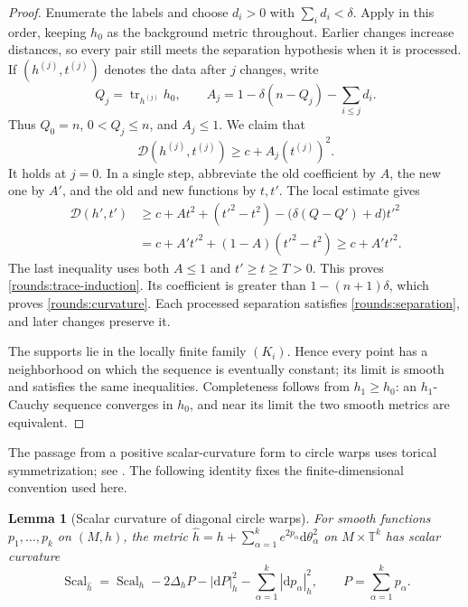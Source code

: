 \documentclass[11pt]{article}
\numberwithin{equation}{section}
\newtheorem{lemma}[theorem]{Lemma}
\theoremstyle{definition}
\theoremstyle{remark}
\begin{document}
\begin{proof}
Enumerate the labels and choose \(d_i>0\) with
\(\sum_i d_i<\delta\). Apply  in this order, keeping
\(h_0\) as the background metric throughout. Earlier changes increase
distances, so every pair still meets the separation hypothesis when it
is processed. If \((h^{(j)},t^{(j)})\) denotes the data after \(j\) changes,
write
\[
 Q_j=\operatorname{tr}_{h^{(j)}}h_0,\qquad
 A_j=1-\delta(n-Q_j)-\sum_{i\le j}d_i.
\]
Thus \(Q_0=n\), \(0<Q_j\le n\), and \(A_j\le1\).
We claim that
\begin{equation}\label{rounds:trace-induction}
 \mathcal D(h^{(j)},t^{(j)})\ge c+A_j(t^{(j)})^2.
\end{equation}
It holds at \(j=0\). In a single step, abbreviate the old coefficient
by \(A\), the new one by \(A'\), and the old and new functions by
\(t,t'\). The local estimate gives
\begin{align*}
 \mathcal D(h',t')
 &\ge c+At^2+(t'^2-t^2)
       -\bigl(\delta(Q-Q')+d\bigr)t'^2\\
 &=c+A't'^2+(1-A)(t'^2-t^2)\ge c+A't'^2.
\end{align*}
The last inequality uses both \(A\le1\) and \(t'\ge t\ge T>0\).
This proves \eqref{rounds:trace-induction}. Its coefficient is greater
than \(1-(n+1)\delta\), which proves \eqref{rounds:curvature}.
Each processed separation satisfies \eqref{rounds:separation}, and
later changes preserve it.

The supports lie in the locally finite family \((K_i)\). Hence every
point has a neighborhood on which the sequence is eventually constant;
its limit is smooth and satisfies the same inequalities. Completeness
follows from \(h_1\ge h_0\): an \(h_1\)-Cauchy sequence converges in
\(h_0\), and near its limit the two smooth metrics are equivalent.
\end{proof}

The passage from a positive scalar-curvature form to circle warps uses
torical symmetrization; see \citet[Section~2]{gromov2018Metric}. The
following identity fixes the finite-dimensional convention used here.

\begin{lemma}[Scalar curvature of diagonal circle warps]\label{rounds:warp-identity}
For smooth functions \(p_1,\ldots,p_k\) on \((M,h)\), the metric
\(\widehat h=h+\sum_{\alpha=1}^k e^{2p_\alpha}\mathrm d\theta_\alpha^2\)
on \(M\times\mathbb T^k\) has scalar curvature
\[
 \operatorname{Scal}_{\widehat h}=\operatorname{Scal}_h-2\Delta_h P-|\mathrm d P|_h^2
                    -\sum_{\alpha=1}^k|\mathrm d p_\alpha|_h^2,
 \qquad P=\sum_{\alpha=1}^k p_\alpha.
\]
\end{lemma}
\end{document}
